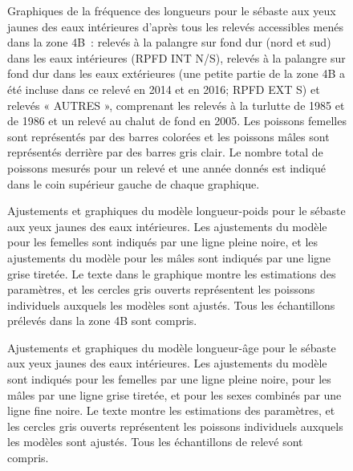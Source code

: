 \documentclass[french,11pt]{book}
\begin{document}
\begin{figure}[htb]

{\centering {} 

}

\caption{Graphiques de la fréquence des longueurs pour le sébaste aux yeux jaunes des eaux intérieures d'après tous les relevés accessibles menés dans la zone 4B~: relevés à la palangre sur fond dur (nord et sud) dans les eaux intérieures (RPFD INT N/S), relevés à la palangre sur fond dur dans les eaux extérieures (une petite partie de la zone 4B a été incluse dans ce relevé en 2014 et en 2016; RPFD EXT S) et relevés « AUTRES », comprenant les relevés à la turlutte de 1985 et de 1986 et un relevé au chalut de fond en 2005. Les poissons femelles sont représentés par des barres colorées et les poissons mâles sont représentés derrière par des barres gris clair. Le nombre total de poissons mesurés pour un relevé et une année donnés est indiqué dans le coin supérieur gauche de chaque graphique.}\label{fig:length-freq}
\end{figure}
\begin{figure}[htb]

{\centering {} 

}

\caption{Ajustements et graphiques du modèle longueur-poids pour le sébaste aux yeux jaunes des eaux intérieures. Les ajustements du modèle pour les femelles sont indiqués par une ligne pleine noire, et les ajustements du modèle pour les mâles sont indiqués par une ligne grise tiretée. Le texte dans le graphique montre les estimations des paramètres, et les cercles gris ouverts représentent les poissons individuels auxquels les modèles sont ajustés. Tous les échantillons prélevés dans la zone 4B sont compris.}\label{fig:length-weight}
\end{figure}
\begin{figure}[htb]

{\centering {} 

}

\caption{Ajustements et graphiques du modèle longueur-âge pour le sébaste aux yeux jaunes des eaux intérieures. Les ajustements du modèle sont indiqués pour les femelles par une ligne pleine noire, pour les mâles par une ligne grise tiretée, et pour les sexes combinés par une ligne fine noire. Le texte montre les estimations des paramètres, et les cercles gris ouverts représentent les poissons individuels auxquels les modèles sont ajustés. Tous les échantillons de relevé sont compris.}\label{fig:length-age}
\end{figure}
\end{document}
